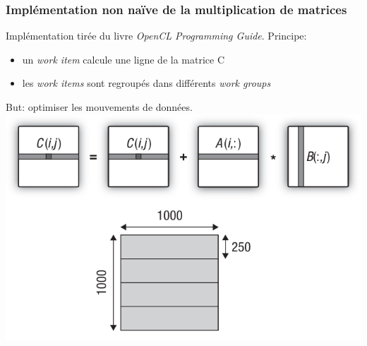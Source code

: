 \begin{frame}
    \frametitle{Implémentation non naïve de la multiplication de matrices}
    Implémentation tirée du livre \textit{OpenCL Programming Guide}.
    \newline
    Principe:\pause{}
    \begin{itemize}
        \item un \textit{work item} calcule une ligne de la matrice C\pause{}
        \item les \textit{work items} sont regroupés dans différents \textit{work groups}\pause{}
    \end{itemize}
    But: optimiser les mouvements de données.\pause{}
    \vspace{10pt}
    \includegraphics[width=\textwidth]{../resources/non_naive_implementation_principle.png}
\end{frame}

